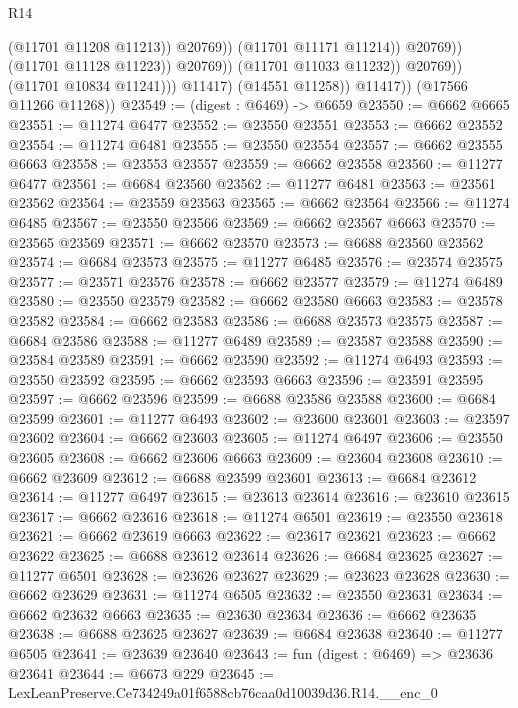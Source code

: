 \begin{lexlean}{R14}
\begin{coremodule}
                                          (@11701 @11208 @11213))
                                        @20769))
                                    (@11701 @11171 @11214))
                                  @20769))
                              (@11701 @11128 @11223))
                            @20769))
                        (@11701 @11033 @11232))
                      @20769))
                  (@11701 @10834 @11241)))
              @11417)
            (@14551 @11258))
          @11417))
      (@17566 @11266 @11268))
@23549 := (digest : @6469) -> @6659
@23550 := @6662 @6665
@23551 := @11274 @6477
@23552 := @23550 @23551
@23553 := @6662 @23552
@23554 := @11274 @6481
@23555 := @23550 @23554
@23557 := @6662 @23555 @6663
@23558 := @23553 @23557
@23559 := @6662 @23558
@23560 := @11277 @6477
@23561 := @6684 @23560
@23562 := @11277 @6481
@23563 := @23561 @23562
@23564 := @23559 @23563
@23565 := @6662 @23564
@23566 := @11274 @6485
@23567 := @23550 @23566
@23569 := @6662 @23567 @6663
@23570 := @23565 @23569
@23571 := @6662 @23570
@23573 := @6688 @23560 @23562
@23574 := @6684 @23573
@23575 := @11277 @6485
@23576 := @23574 @23575
@23577 := @23571 @23576
@23578 := @6662 @23577
@23579 := @11274 @6489
@23580 := @23550 @23579
@23582 := @6662 @23580 @6663
@23583 := @23578 @23582
@23584 := @6662 @23583
@23586 := @6688 @23573 @23575
@23587 := @6684 @23586
@23588 := @11277 @6489
@23589 := @23587 @23588
@23590 := @23584 @23589
@23591 := @6662 @23590
@23592 := @11274 @6493
@23593 := @23550 @23592
@23595 := @6662 @23593 @6663
@23596 := @23591 @23595
@23597 := @6662 @23596
@23599 := @6688 @23586 @23588
@23600 := @6684 @23599
@23601 := @11277 @6493
@23602 := @23600 @23601
@23603 := @23597 @23602
@23604 := @6662 @23603
@23605 := @11274 @6497
@23606 := @23550 @23605
@23608 := @6662 @23606 @6663
@23609 := @23604 @23608
@23610 := @6662 @23609
@23612 := @6688 @23599 @23601
@23613 := @6684 @23612
@23614 := @11277 @6497
@23615 := @23613 @23614
@23616 := @23610 @23615
@23617 := @6662 @23616
@23618 := @11274 @6501
@23619 := @23550 @23618
@23621 := @6662 @23619 @6663
@23622 := @23617 @23621
@23623 := @6662 @23622
@23625 := @6688 @23612 @23614
@23626 := @6684 @23625
@23627 := @11277 @6501
@23628 := @23626 @23627
@23629 := @23623 @23628
@23630 := @6662 @23629
@23631 := @11274 @6505
@23632 := @23550 @23631
@23634 := @6662 @23632 @6663
@23635 := @23630 @23634
@23636 := @6662 @23635
@23638 := @6688 @23625 @23627
@23639 := @6684 @23638
@23640 := @11277 @6505
@23641 := @23639 @23640
@23643 := fun (digest : @6469) => @23636 @23641
@23644 := @6673 @229
@23645 := LexLeanPreserve.Ce734249a01f6588cb76caa0d10039d36.R14.__enc_0

\end{coremodule}
\end{lexlean}
